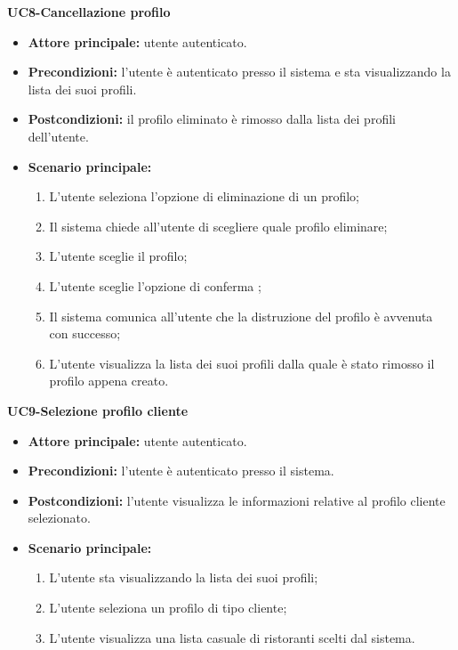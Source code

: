 \textbf{UC8-Cancellazione profilo}
\begin{itemize}
\item \textbf{Attore principale:} utente autenticato.
\item \textbf{Precondizioni:} l'utente è autenticato presso il sistema e sta visualizzando la lista dei suoi profili.
\item \textbf{Postcondizioni:} il profilo eliminato è rimosso dalla lista dei profili dell'utente.
\item \textbf{Scenario principale:}
\begin{enumerate}
    \item L'utente seleziona l'opzione di eliminazione di un profilo;
    \item Il sistema chiede all'utente di scegliere quale profilo eliminare;
    \item L'utente sceglie il profilo;
    \item L'utente sceglie l'opzione di conferma ;
    \item Il sistema comunica all'utente che la distruzione del profilo è avvenuta con successo;
    \item L'utente visualizza la lista dei suoi profili dalla quale è stato rimosso il profilo appena creato.
\end{enumerate}
\end{itemize}

\textbf{UC9-Selezione profilo cliente}
\begin{itemize}
\item \textbf{Attore principale:} utente autenticato.
\item \textbf{Precondizioni:} l'utente è autenticato presso il sistema.
\item \textbf{Postcondizioni:} l'utente visualizza le informazioni relative al profilo cliente selezionato.
\item \textbf{Scenario principale:}
\begin{enumerate}
    \item L'utente sta visualizzando la lista dei suoi profili;
    \item L'utente seleziona un profilo di tipo cliente;
    \item L'utente visualizza una lista casuale di ristoranti scelti dal sistema.
\end{enumerate}
\end{itemize}

